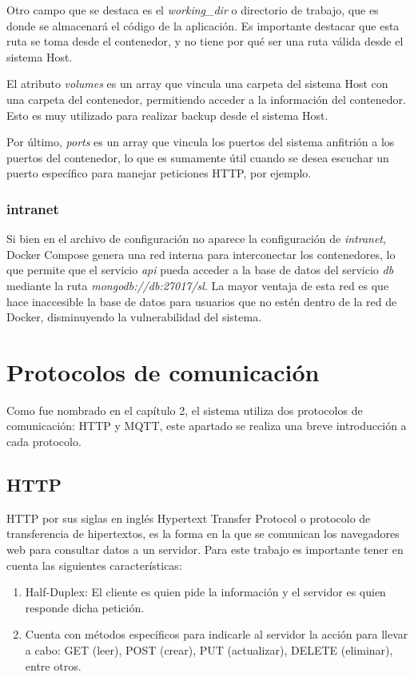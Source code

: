 Otro campo que se destaca es el \textit{working\_dir} o directorio de trabajo, que es donde se almacenará el código de la aplicación. Es importante destacar que esta ruta se toma desde el contenedor, y no tiene por qué ser una ruta válida desde el sistema Host.

El atributo \textit{volumes} es un array que vincula una carpeta del sistema Host con una carpeta del contenedor, permitiendo acceder a la información del contenedor.
Esto es muy utilizado para realizar backup desde el sistema Host.

Por último, \textit{ports} es un array que vincula los puertos del sistema anfitrión a los puertos del contenedor, lo que es sumamente útil cuando se desea escuchar un puerto específico para manejar peticiones HTTP, por ejemplo.

\subsubsection{intranet}

Si bien en el archivo de configuración no aparece la configuración de \textit{intranet}, Docker Compose genera una red interna para interconectar los contenedores, lo que permite que el servicio \textit{api} pueda acceder a la base de datos del servicio \textit{db} mediante la ruta \textit{mongodb://db:27017/sl}. La mayor ventaja de esta red es que hace inaccesible la base de datos para usuarios que no estén dentro de la red de Docker, disminuyendo la vulnerabilidad del sistema.


\section{Protocolos de comunicación}

Como fue nombrado en el capítulo 2, el sistema utiliza dos protocolos de comunicación: HTTP y MQTT, este apartado se realiza una breve introducción a cada protocolo.

\subsection{HTTP}

HTTP por sus siglas en inglés Hypertext Transfer Protocol o protocolo de transferencia de hipertextos, es la forma en la que se comunican los navegadores web para consultar datos a un servidor.
Para este trabajo es importante tener en cuenta las siguientes características:

\begin{enumerate}
    \item Half-Duplex: El cliente es quien pide la información y el servidor es quien responde dicha petición.
    \item Cuenta con métodos específicos para indicarle al servidor la acción para llevar a cabo: GET (leer), POST (crear), PUT (actualizar), DELETE (eliminar), entre otros.
\end{enumerate}

